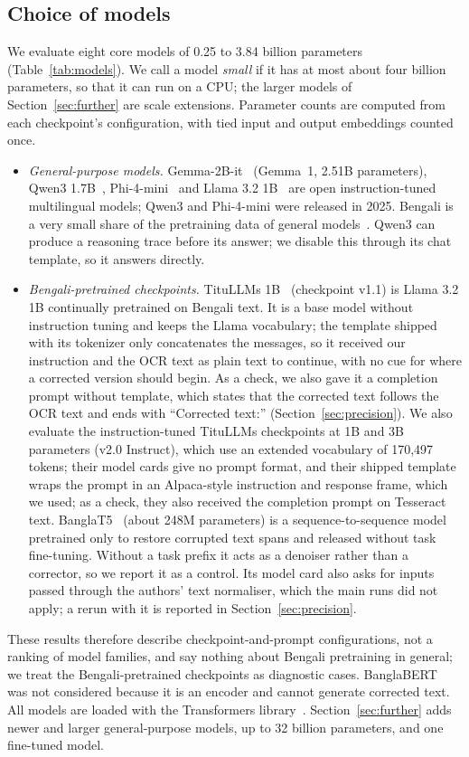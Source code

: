 \documentclass[conference]{IEEEtran}
\begin{document}
\subsection{Choice of models}
We evaluate eight core models of 0.25 to 3.84 billion parameters (Table~\ref{tab:models}). We call a model \emph{small} if it has at most about four billion parameters, so that it can run on a CPU; the larger models of Section~\ref{sec:further} are scale extensions. Parameter counts are computed from each checkpoint's configuration, with tied input and output embeddings counted once.
\begin{itemize}
\item \emph{General-purpose models.} Gemma-2B-it~\cite{gemma2024card} (Gemma~1, 2.51B parameters), Qwen3 1.7B~\cite{qwen2025card}, Phi-4-mini~\cite{phi4mini2025card} and Llama 3.2 1B~\cite{meta2024llama32} are open instruction-tuned multilingual models; Qwen3 and Phi-4-mini were released in 2025. Bengali is a very small share of the pretraining data of general models~\cite{zehady2026banglallama}. Qwen3 can produce a reasoning trace before its answer; we disable this through its chat template, so it answers directly.
\item \emph{Bengali-pretrained checkpoints.} TituLLMs 1B~\cite{nahin2025titullms} (checkpoint v1.1) is Llama 3.2 1B continually pretrained on Bengali text. It is a base model without instruction tuning and keeps the Llama vocabulary; the template shipped with its tokenizer only concatenates the messages, so it received our instruction and the OCR text as plain text to continue, with no cue for where a corrected version should begin. As a check, we also gave it a completion prompt without template, which states that the corrected text follows the OCR text and ends with ``Corrected text:'' (Section~\ref{sec:precision}). We also evaluate the instruction-tuned TituLLMs checkpoints at 1B and 3B parameters (v2.0 Instruct), which use an extended vocabulary of 170{,}497 tokens; their model cards give no prompt format, and their shipped template wraps the prompt in an Alpaca-style instruction and response frame, which we used; as a check, they also received the completion prompt on Tesseract text. BanglaT5~\cite{bhattacharjee2023banglat5} (about 248M parameters) is a sequence-to-sequence model pretrained only to restore corrupted text spans and released without task fine-tuning. Without a task prefix it acts as a denoiser rather than a corrector, so we report it as a control. Its model card also asks for inputs passed through the authors' text normaliser, which the main runs did not apply; a rerun with it is reported in Section~\ref{sec:precision}.
\end{itemize}
These results therefore describe checkpoint-and-prompt configurations, not a ranking of model families, and say nothing about Bengali pretraining in general; we treat the Bengali-pretrained checkpoints as diagnostic cases. BanglaBERT~\cite{bhattacharjee2022banglabert} was not considered because it is an encoder and cannot generate corrected text. All models are loaded with the Transformers library~\cite{wolf2020transformers}. Section~\ref{sec:further} adds newer and larger general-purpose models, up to 32 billion parameters, and one fine-tuned model.
\end{document}
